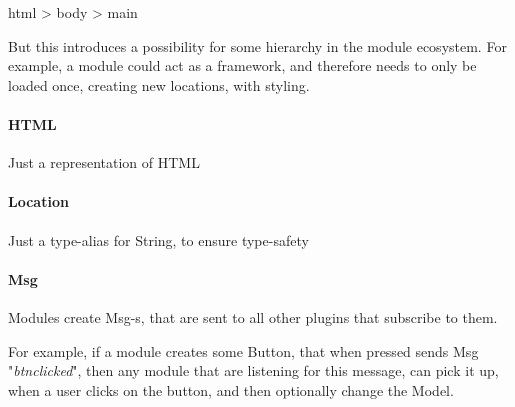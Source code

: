 html > body > main

But this introduces a possibility for some hierarchy in the module ecosystem.
For example, a module could act as a framework, and therefore needs to only be
loaded once, creating new locations, with styling.


\paragraph{HTML}
Just a representation of HTML


\paragraph{Location}
Just a type-alias for String, to ensure type-safety


\paragraph{Msg}
Modules create Msg-s, that are sent to all other plugins that subscribe to them.

For example, if a module creates some Button, that when pressed sends
Msg "\textit{btn\-clicked}", then any module that are listening for this message, can pick
it up, when a user clicks on the button, and then optionally change the Model.
